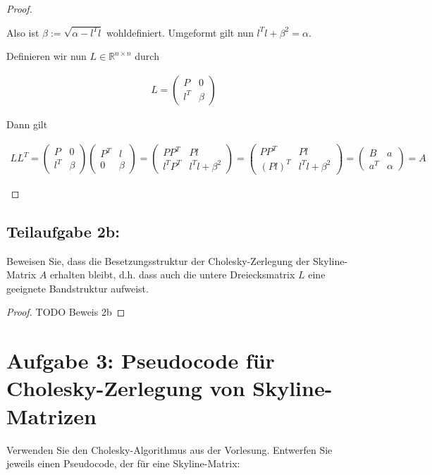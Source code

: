 \documentclass[]{article}
\begin{document}
\begin{proof}
\begin{itemize}
		Also ist $\beta := \sqrt{\alpha - l^Tl}$ wohldefiniert. Umgeformt gilt nun $l^Tl + \beta^2 = \alpha$.
		
		Definieren wir nun $L \in \mathbb{R}^{n\times n}$ durch
		
		\begin{align*}
			L = \begin{pmatrix}
				P & 0 \\
				l^T & \beta
			\end{pmatrix}
		\end{align*}
	
		Dann gilt
		
		\begin{align*}
			LL^T = \begin{pmatrix}
				P & 0 \\
				l^T & \beta
			\end{pmatrix} \begin{pmatrix}
				P^T & l \\
				0 & \beta
			\end{pmatrix} = \begin{pmatrix}
				PP^T & Pl \\
				l^TP^T & l^Tl+\beta^2
			\end{pmatrix} = \begin{pmatrix}
				PP^T & Pl \\
				(Pl)^T & l^Tl+\beta^2
			\end{pmatrix} = \begin{pmatrix}
				B & a \\
				a^T & \alpha
			\end{pmatrix} = A
		\end{align*}
	\end{itemize}
	
\end{proof}


\subsection*{Teilaufgabe 2b:}
Beweisen Sie, dass die Besetzungsstruktur der Cholesky-Zerlegung der Skyline-Matrix $A$ erhalten bleibt, d.h. dass auch die untere Dreiecksmatrix $L$ eine geeignete Bandstruktur aufweist.

\begin{proof}
	TODO Beweis 2b
\end{proof}
\newpage



\section*{Aufgabe 3: Pseudocode für Cholesky-Zerlegung von Skyline-Matrizen}
Verwenden Sie den Cholesky-Algorithmus aus der Vorlesung. Entwerfen Sie jeweils einen Pseudocode, der für eine Skyline-Matrix:
\end{document}
